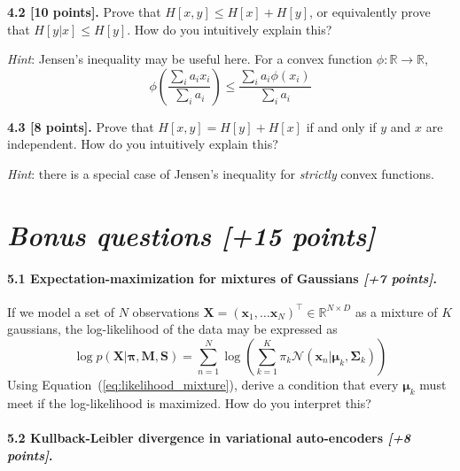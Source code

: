 \documentclass{article}
\begin{document}
\noindent\textbf{4.2 [10 points].} Prove that $H[x,y] \leq H[x] + H[y]$, or equivalently prove that $H[y|x] \leq H[y]$. How do you intuitively explain this?

\noindent\textit{Hint}: Jensen's inequality may be useful here. For a convex function $\phi: \mathbb{R} \rightarrow \mathbb{R}$,
\begin{equation}
\phi \left( \frac{\sum_i a_i x_i}{\sum_i a_i} \right) \leq \frac{\sum_i a_i \phi(x_i)}{\sum_i a_i}
\end{equation}

\noindent\textbf{4.3 [8 points].} Prove that $H[x,y] = H[y] + H[x]$ if and only if $y$ and $x$ are independent. How do you intuitively explain this?

\noindent\textit{Hint}: there is a special case of Jensen's inequality for \emph{strictly} convex functions.

\section{\textit{Bonus questions [+15 points]}}

\paragraph{5.1 Expectation-maximization for mixtures of Gaussians \textit{[+7 points]}.}
If we model a set of $N$ observations $\mathbf{X} = (\mathbf{x}_1, \dots \mathbf{x}_N)^\top \in \mathbb{R}^{N \times D}$ as a mixture of $K$ gaussians, the log-likelihood of the data may be expressed as
\begin{equation} \label{eq:likelihood_mixture}
\log p(\mathbf{X}|\boldsymbol{\pi}, \mathbf{M}, \boldsymbol{S}) = \sum_{n=1}^N \log \left(\sum_{k=1}^K \pi_k\mathcal{N}(\mathbf{x}_n|\boldsymbol{\mu}_k, \boldsymbol{\Sigma}_k)\right)   
\end{equation}
Using Equation~(\ref{eq:likelihood_mixture}), 
derive a condition that every $\boldsymbol{\mu}_k$ must meet if the log-likelihood is maximized. How do you interpret this?

\paragraph{5.2 Kullback-Leibler divergence in variational auto-encoders \textit{[+8 points]}.}
\end{document}
